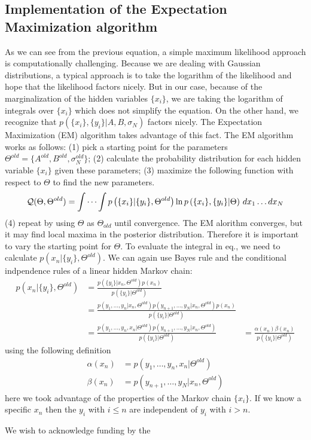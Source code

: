 \documentclass[%
 reprint,
 amsmath,amssymb,
 aps,
]{revtex4-1}
\begin{document}
\subsection{Implementation of the Expectation Maximization algorithm}
As we can see from the previous equation, a simple maximum likelihood approach is computationally challenging.  Because we are dealing with Gaussian distributions, a typical approach is to take the logarithm of the likelihood and hope that the likelihood factors nicely.  But in our case, because of the marginalization of the hidden variables $\{x_{i}\}$, we are taking the logarithm of integrals over $\{x_{i}\}$ which does not simplify the equation.  On the other hand, we recognize that $p\left( \{x_{i}\},\{y_{i}\}|A,B,\sigma_{N}\right)$ factors nicely.  The Expectation Maximization (EM) algorithm takes advantage of this fact.  The EM algorithm works as follows: (1) pick a starting point for the parameters $\Theta^{old} = \{A^{old},B^{old},\sigma_{N}^{old}\}$; (2) calculate the probability distribution for each hidden variable $\{x_{i}\}$ given these parameters; (3) maximize the following function with respect to $\Theta$ to find the new parameters.
\begin{equation}
	\mathcal{Q}(\Theta,\Theta^{old}) = \idotsint p\left( \{x_{i}\}|\{y_{i}\},\Theta^{old}\right)\ln p\left( \{x_{i}\},\{y_{i}\}|\Theta\right)\,dx_1 \dots dx_N
\end{equation}
(4) repeat by using $\Theta$ as $\Theta_{old}$ until convergence.  The EM alorithm converges, but it may find local maxima in the posterior distribution.  Therefore it is important to vary the starting point for $\Theta$.  To evaluate the integral in eq., we need to calculate $p\left( x_{n}|\{y_{i}\},\Theta^{old}\right)$.  We can again use Bayes rule and the conditional indpendence rules of a linear hidden Markov chain:
\begin{equation}
	\begin{aligned}
	p\left( x_{n}|\{y_{i}\},\Theta^{old}\right)&=\frac{p\left( \{y_{i}\}|x_{n},\Theta^{old}\right)p(x_{n})}{p(\{y_{i}\}|\Theta^{old})}\\
	&=\frac{p(y_{1},\dots,y_{n}|x_{n},\Theta^{old})p(y_{n+1},\dots,y_{N}|x_{n},\Theta^{old})p(x_{n})}{p(\{y_{i}\}|\Theta^{old})}\\
	&=\frac{p(y_{1},\dots,y_{n},x_{n}|\Theta^{old})p(y_{n+1},\dots,y_{N}|x_{n},\Theta^{old})}{p(\{y_{i}\}|\Theta^{old})}
	&=\frac{\alpha(x_{n})\beta(x_{n})}{p(\{y_{i}\}|\Theta^{old})}
	\end{aligned}
\end{equation}
using the following definition
\begin{equation}
	\begin{aligned}
	\alpha(x_{n})&=p(y_{1},\dots,y_{n},x_{n}|\Theta^{old})\\
	\beta(x_{n})&=p(y_{n+1},\dots,y_{N}|x_{n},\Theta^{old})
	\end{aligned}
\end{equation}
here we took advantage of the properties of the Markov chain $\{x_{i}\}$.  If we know a specific $x_{n}$ then the $y_{i}$ with $i\leq n$ are independent of $y_{i}$ with $i>n$.
\begin{acknowledgments}
We wish to acknowledge funding by the 
\end{acknowledgments}
\end{document}
